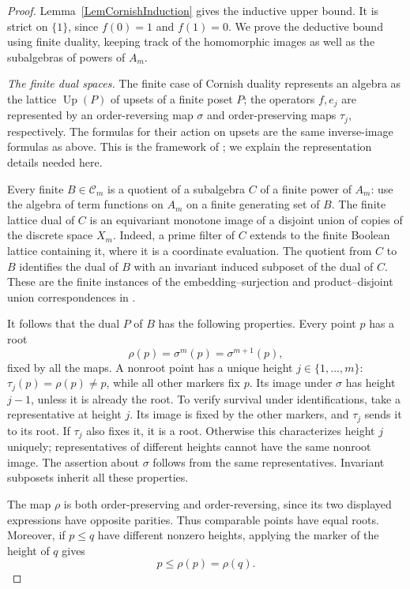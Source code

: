 \documentclass[12pt,english]{amsart}
\theoremstyle{definition}
\numberwithin{equation}{section}
\theoremstyle{remark}
\begin{document}
\begin{proof}
Lemma~\ref{LemCornishInduction} gives the inductive upper bound. It is
strict on $\{1\}$, since $f(0)=1$ and $f(1)=0$. We prove the deductive
bound using finite duality, keeping track of the homomorphic images
as well as the subalgebras of powers of $A_m$.

\emph{The finite dual spaces.}
The finite case of Cornish duality represents an algebra as the
lattice $\operatorname{Up}(P)$ of upsets of a finite poset $P$; the
operators $f,e_j$ are represented by an order-reversing map $\sigma$
and order-preserving maps $\tau_j$, respectively. The formulas for
their action on upsets are the same inverse-image formulas as above.
This is the framework of \cite[Theorem~5.2]{DaveyGair16}; we explain
the representation details needed here.

Every finite $B\in\mathcal C_m$ is a quotient of a subalgebra $C$ of
a finite power of $A_m$: use the algebra of term functions on $A_m$
on a finite generating set of $B$. The finite lattice dual of $C$
is an equivariant monotone image of a disjoint union of copies of
the discrete space $X_m$. Indeed, a prime filter of $C$ extends to
the finite Boolean lattice containing it, where it is a coordinate
evaluation. The quotient from $C$ to $B$ identifies the dual of $B$
with an invariant induced subposet of the dual of $C$. These are the
finite instances of the embedding--surjection and product--disjoint
union correspondences in \cite[Lemmas~2.7 and~2.10]{DaveyGair16}.

It follows that the dual $P$ of $B$ has the following properties.
Every point $p$ has a root
\[
\rho(p)=\sigma^m(p)=\sigma^{m+1}(p),
\]
fixed by all the maps. A nonroot point has a unique height
$j\in\{1,\ldots,m\}$: $\tau_j(p)=\rho(p)\ne p$, while all other
markers fix $p$. Its image under $\sigma$ has height $j-1$, unless
it is already the root. To verify survival under identifications,
take a representative at height $j$. Its image is fixed by the other
markers, and $\tau_j$ sends it to its root. If $\tau_j$ also fixes
it, it is a root. Otherwise this characterizes height $j$ uniquely;
representatives of different heights cannot have the same nonroot
image. The assertion about $\sigma$ follows from the same
representatives. Invariant subposets inherit all these properties.

The map $\rho$ is both order-preserving and order-reversing, since
its two displayed expressions have opposite parities. Thus comparable
points have equal roots. Moreover, if $p\leqslant q$ have different
nonzero heights, applying the marker of the height of $q$ gives
\begin{equation}\label{EqCornishHeightSeparation}
p\leqslant\rho(p)=\rho(q).
\end{equation}


\end{proof}
\end{document}
